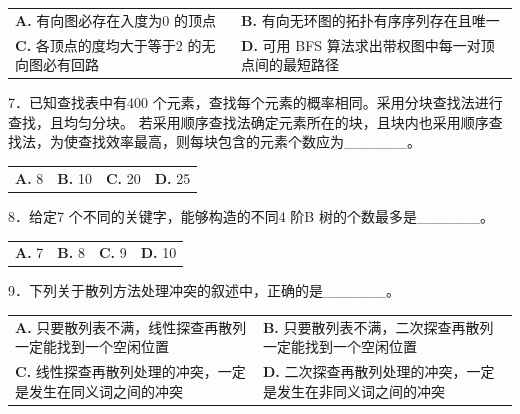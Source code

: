 \documentclass[UTF8,11pt]{ctexart}
\begin{document}
\begin{center}\begin{tabular}{>{\raggedright\arraybackslash}p{\dimexpr(\linewidth-4\tabcolsep)/2\relax}>{\raggedright\arraybackslash}p{\dimexpr(\linewidth-4\tabcolsep)/2\relax}}
\textbf{A.} 有向图必存在入度为0 的顶点 & \textbf{B.} 有向无环图的拓扑有序序列存在且唯一\\[.35em]
\textbf{C.} 各顶点的度均大于等于2 的无向图必有回路 & \textbf{D.} 可用 BFS 算法求出带权图中每一对顶点间的最短路径\\[.35em]\end{tabular}\end{center}

7．已知查找表中有400 个元素，查找每个元素的概率相同。采用分块查找法进行查找，且均匀分块。 若采用顺序查找法确定元素所在的块，且块内也采用顺序查找法，为使查找效率最高，则每块包含的元素个数应为\_\_\_\_\_\_。


\begin{center}\begin{tabular}{>{\raggedright\arraybackslash}p{\dimexpr(\linewidth-8\tabcolsep)/4\relax}>{\raggedright\arraybackslash}p{\dimexpr(\linewidth-8\tabcolsep)/4\relax}>{\raggedright\arraybackslash}p{\dimexpr(\linewidth-8\tabcolsep)/4\relax}>{\raggedright\arraybackslash}p{\dimexpr(\linewidth-8\tabcolsep)/4\relax}}
\textbf{A.} 8 & \textbf{B.} 10 & \textbf{C.} 20 & \textbf{D.} 25\\[.35em]\end{tabular}\end{center}

8．给定7 个不同的关键字，能够构造的不同4 阶B 树的个数最多是\_\_\_\_\_\_。


\begin{center}\begin{tabular}{>{\raggedright\arraybackslash}p{\dimexpr(\linewidth-8\tabcolsep)/4\relax}>{\raggedright\arraybackslash}p{\dimexpr(\linewidth-8\tabcolsep)/4\relax}>{\raggedright\arraybackslash}p{\dimexpr(\linewidth-8\tabcolsep)/4\relax}>{\raggedright\arraybackslash}p{\dimexpr(\linewidth-8\tabcolsep)/4\relax}}
\textbf{A.} 7 & \textbf{B.} 8 & \textbf{C.} 9 & \textbf{D.} 10\\[.35em]\end{tabular}\end{center}

9．下列关于散列方法处理冲突的叙述中，正确的是\_\_\_\_\_\_。


\begin{center}\begin{tabular}{>{\raggedright\arraybackslash}p{\dimexpr(\linewidth-4\tabcolsep)/2\relax}>{\raggedright\arraybackslash}p{\dimexpr(\linewidth-4\tabcolsep)/2\relax}}
\textbf{A.} 只要散列表不满，线性探查再散列一定能找到一个空闲位置 & \textbf{B.} 只要散列表不满，二次探查再散列一定能找到一个空闲位置\\[.35em]
\textbf{C.} 线性探查再散列处理的冲突，一定是发生在同义词之间的冲突 & \textbf{D.} 二次探查再散列处理的冲突，一定是发生在非同义词之间的冲突\\[.35em]\end{tabular}\end{center}
\end{document}
